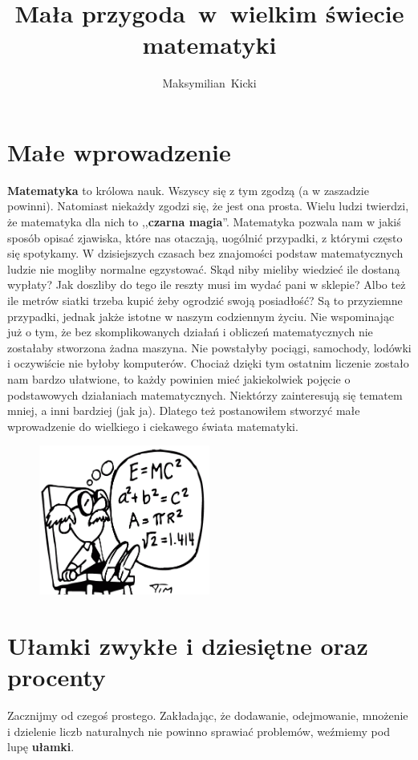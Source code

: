 \documentclass[12pt, a4paper]{article}
\author{Maksymilian~Kicki}
\title{Mała przygoda~w~wielkim świecie matematyki}
\date{}
\begin{document}
\maketitle

\tableofcontents
\newpage
\section{Małe wprowadzenie}
\label{sec:Male_wprowadzenie}
\textbf{Matematyka} to królowa nauk. Wszyscy się z tym zgodzą (a w zaszadzie powinni). Natomiast niekażdy zgodzi się, że jest ona prosta. Wielu ludzi twierdzi, że matematyka dla nich to ,,\textbf{czarna magia}''. Matematyka pozwala nam w jakiś sposób opisać zjawiska, które nas otaczają, uogólnić przypadki, z którymi często się spotykamy. W dzisiejszych czasach bez znajomości podstaw matematycznych ludzie nie mogliby normalne egzystować. Skąd niby mieliby wiedzieć ile dostaną wypłaty? Jak doszliby do tego ile reszty musi im wydać pani w sklepie? Albo też ile metrów siatki trzeba kupić żeby ogrodzić swoją posiadłość? Są to przyziemne przypadki, jednak jakże istotne w naszym codziennym życiu. Nie wspominając już o tym, że bez skomplikowanych działań i obliczeń matematycznych nie zostałaby stworzona żadna maszyna. Nie powstałyby pociągi, samochody, lodówki i oczywiście nie byłoby komputerów. Chociaż dzięki tym ostatnim liczenie zostało nam bardzo ułatwione, to każdy powinien mieć jakiekolwiek pojęcie o podstawowych działaniach matematycznych. Niektórzy zainteresują się tematem mniej, a inni bardziej (jak ja). Dlatego też postanowiłem stworzyć małe wprowadzenie do wielkiego i ciekawego świata matematyki.
\begin{figure}[htbp]
	\centering
		\includegraphics[width=0.50\textwidth]{matematyka.png}
	\label{fig:matematyka}
\end{figure}

\newpage
\section{Ułamki zwykłe i dziesiętne oraz procenty}
\label{subsec:Ulamki}
Zacznijmy od czegoś prostego. Zakładając, że dodawanie, odejmowanie, mnożenie i dzielenie liczb naturalnych nie powinno sprawiać problemów, weźmiemy pod lupę \textbf{ułamki}.
\end{document}
